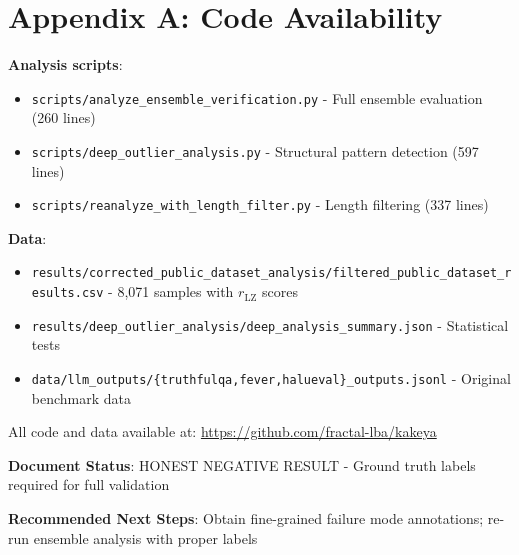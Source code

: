 \documentclass[11pt]{article}
\begin{document}
\section*{Appendix A: Code Availability}

\textbf{Analysis scripts}:
\begin{itemize}
\item \texttt{scripts/analyze\_ensemble\_verification.py} - Full ensemble evaluation (260 lines)
\item \texttt{scripts/deep\_outlier\_analysis.py} - Structural pattern detection (597 lines)
\item \texttt{scripts/reanalyze\_with\_length\_filter.py} - Length filtering (337 lines)
\end{itemize}

\textbf{Data}:
\begin{itemize}
\item \texttt{results/corrected\_public\_dataset\_analysis/filtered\_public\_dataset\_results.csv} - 8,071 samples with $r_{\text{LZ}}$ scores
\item \texttt{results/deep\_outlier\_analysis/deep\_analysis\_summary.json} - Statistical tests
\item \texttt{data/llm\_outputs/\{truthfulqa,fever,halueval\}\_outputs.jsonl} - Original benchmark data
\end{itemize}

All code and data available at: \url{https://github.com/fractal-lba/kakeya}

\textbf{Document Status}: HONEST NEGATIVE RESULT - Ground truth labels required for full validation

\textbf{Recommended Next Steps}: Obtain fine-grained failure mode annotations; re-run ensemble analysis with proper labels
\end{document}
